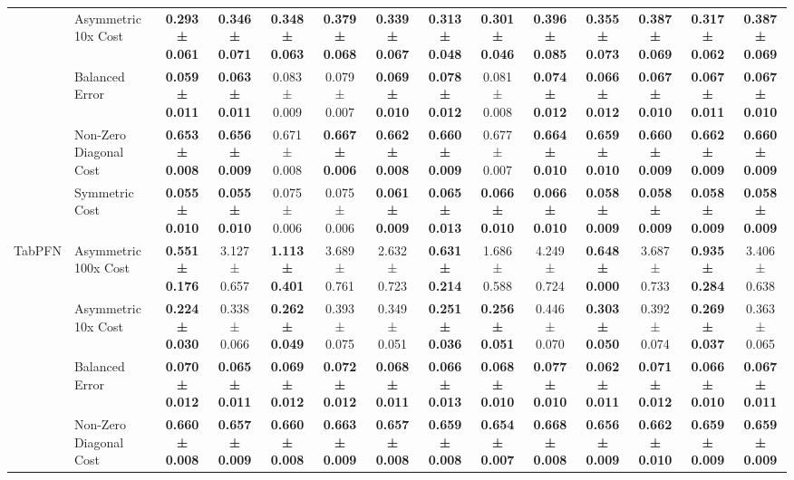\begin{table}[H]
{\begin{tabular}{llcccccccccccc}
 & Asymmetric 10x Cost & \textbf{0.293 ± 0.061} & \textbf{0.346 ± 0.071} & \textbf{0.348 ± 0.063} & \textbf{0.379 ± 0.068} & \textbf{0.339 ± 0.067} & \textbf{0.313 ± 0.048} & \textbf{0.301 ± 0.046} & \textbf{0.396 ± 0.085} & \textbf{0.355 ± 0.073} & \textbf{0.387 ± 0.069} & \textbf{0.317 ± 0.062} & \textbf{0.387 ± 0.069} \\
 & Balanced Error & \textbf{0.059 ± 0.011} & \textbf{0.063 ± 0.011} & 0.083 ± 0.009 & 0.079 ± 0.007 & \textbf{0.069 ± 0.010} & \textbf{0.078 ± 0.012} & 0.081 ± 0.008 & \textbf{0.074 ± 0.012} & \textbf{0.066 ± 0.012} & \textbf{0.067 ± 0.010} & \textbf{0.067 ± 0.011} & \textbf{0.067 ± 0.010} \\
 & Non-Zero Diagonal Cost & \textbf{0.653 ± 0.008} & \textbf{0.656 ± 0.009} & 0.671 ± 0.008 & \textbf{0.667 ± 0.006} & \textbf{0.662 ± 0.008} & \textbf{0.660 ± 0.009} & 0.677 ± 0.007 & \textbf{0.664 ± 0.010} & \textbf{0.659 ± 0.010} & \textbf{0.660 ± 0.009} & \textbf{0.662 ± 0.009} & \textbf{0.660 ± 0.009} \\
 & Symmetric Cost & \textbf{0.055 ± 0.010} & \textbf{0.055 ± 0.010} & 0.075 ± 0.006 & 0.075 ± 0.006 & \textbf{0.061 ± 0.009} & \textbf{0.065 ± 0.013} & \textbf{0.066 ± 0.010} & \textbf{0.066 ± 0.010} & \textbf{0.058 ± 0.009} & \textbf{0.058 ± 0.009} & \textbf{0.058 ± 0.009} & \textbf{0.058 ± 0.009} \\
\cline{1-14}
\multirow[t]{5}{*}{TabPFN} & Asymmetric 100x Cost & \textbf{0.551 ± 0.176} & 3.127 ± 0.657 & \textbf{1.113 ± 0.401} & 3.689 ± 0.761 & 2.632 ± 0.723 & \textbf{0.631 ± 0.214} & 1.686 ± 0.588 & 4.249 ± 0.724 & \textbf{0.648 ± 0.000} & 3.687 ± 0.733 & \textbf{0.935 ± 0.284} & 3.406 ± 0.638 \\
 & Asymmetric 10x Cost & \textbf{0.224 ± 0.030} & 0.338 ± 0.066 & \textbf{0.262 ± 0.049} & 0.393 ± 0.075 & 0.349 ± 0.051 & \textbf{0.251 ± 0.036} & \textbf{0.256 ± 0.051} & 0.446 ± 0.070 & \textbf{0.303 ± 0.050} & 0.392 ± 0.074 & \textbf{0.269 ± 0.037} & 0.363 ± 0.065 \\
 & Balanced Error & \textbf{0.070 ± 0.012} & \textbf{0.065 ± 0.011} & \textbf{0.069 ± 0.012} & \textbf{0.072 ± 0.012} & \textbf{0.068 ± 0.011} & \textbf{0.066 ± 0.013} & \textbf{0.068 ± 0.010} & \textbf{0.077 ± 0.010} & \textbf{0.062 ± 0.011} & \textbf{0.071 ± 0.012} & \textbf{0.066 ± 0.010} & \textbf{0.067 ± 0.011} \\
 & Non-Zero Diagonal Cost & \textbf{0.660 ± 0.008} & \textbf{0.657 ± 0.009} & \textbf{0.660 ± 0.008} & \textbf{0.663 ± 0.009} & \textbf{0.657 ± 0.008} & \textbf{0.659 ± 0.008} & \textbf{0.654 ± 0.007} & \textbf{0.668 ± 0.008} & \textbf{0.656 ± 0.009} & \textbf{0.662 ± 0.010} & \textbf{0.659 ± 0.009} & \textbf{0.659 ± 0.009} \\

\end{tabular}}
\end{table}
